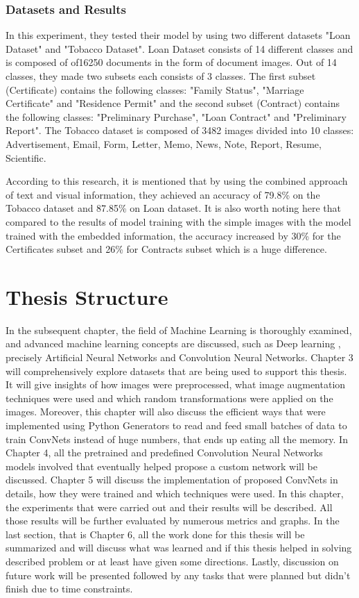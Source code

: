 \subsubsection{Datasets and Results}
In this experiment, they tested their model by using two different datasets "Loan Dataset" and "Tobacco Dataset". Loan Dataset consists of 14 different classes and is composed of of16250 documents in the form of document images. Out of 14 classes, they made two subsets each consists of 3 classes. The first subset (Certificate) contains the following classes: "Family Status", "Marriage Certificate" and "Residence Permit" and the second subset (Contract) contains the following classes: "Preliminary Purchase", "Loan Contract" and "Preliminary Report". The Tobacco dataset is composed of 3482 images divided into 10 classes: Advertisement, Email, Form, Letter, Memo, News, Note, Report, Resume, Scientific.
\newline
\par
According to this research, it is mentioned that by using the combined approach of text and visual information, they achieved an accuracy of 79.8\% on the Tobacco dataset and 87.85\% on Loan dataset. It is also worth noting here that compared to the results of model training with the simple images with the model trained with the embedded information, the accuracy increased by 30\% for the Certificates subset and 26\% for Contracts subset which is a huge difference.
\section{Thesis Structure}
In the subsequent chapter, the field of Machine Learning is thoroughly examined, and advanced machine learning concepts are discussed, such as Deep learning \cite{deep_learning}, precisely Artificial Neural Networks \cite{ann} and Convolution Neural Networks. Chapter 3 will comprehensively explore datasets that are being used to support this thesis. It will give insights of how images were preprocessed, what image augmentation techniques were used and which random transformations were applied on the images. Moreover, this chapter will also discuss the efficient ways that were implemented using Python Generators to read and feed small batches of data to train ConvNets instead of huge numbers, that ends up eating all the memory. In Chapter 4, all the pretrained and predefined Convolution Neural Networks models involved that eventually helped propose a custom network will be discussed. Chapter 5 will discuss the implementation of proposed ConvNets in details, how they were trained and which techniques were used. In this chapter, the experiments that were carried out and their results will be described. All those results will be further evaluated by numerous metrics and graphs. In the last section, that is Chapter 6, all the work done for this thesis will be summarized and will discuss what was learned and if this thesis helped in solving described problem or at least have given some directions. Lastly, discussion on future work will be presented followed by any tasks that were planned but didn't finish due to time constraints.
